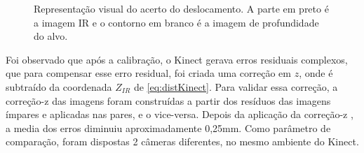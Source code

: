 \begin{figure}[!h]
	\centering
	\caption{%
	Representação visual do acerto do deslocamento. A parte em preto é a imagem IR e o contorno em branco é a imagem de profundidade do alvo.
	}\label{fig:deslocKinect}
\end{figure}

Foi observado que após a calibração, o Kinect gerava erros residuais complexos, que para compensar esse erro residual, foi criada uma correção em $z$, onde é subtraído da coordenada $Z_{IR}$ de \ref{eq:distKinect}.
Para validar essa correção, a correção-z das imagens foram construídas a partir dos resíduos das imagens ímpares e aplicadas nas pares, e o vice-versa. Depois da aplicação da correção-z , a media dos erros diminuiu aproximadamente 0,25mm.
Como parâmetro de comparação, foram dispostas 2 câmeras diferentes, no mesmo ambiente do Kinect.

